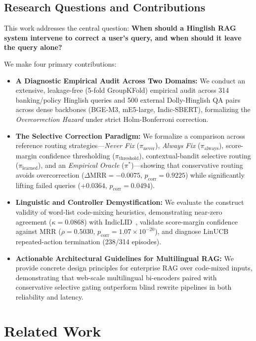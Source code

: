 \documentclass[conference]{IEEEtran}
\begin{document}
\subsection{Research Questions and Contributions}
This work addresses the central question: \textbf{When should a Hinglish RAG system intervene to correct a user's query, and when should it leave the query alone?}

We make four primary contributions:
\begin{itemize}
    \item \textbf{A Diagnostic Empirical Audit Across Two Domains:} We conduct an extensive, leakage-free (5-fold GroupKFold) empirical audit across 314 banking/policy Hinglish queries and 500 external Dolly-Hinglish QA pairs across dense backbones (BGE-M3, mE5-large, Indic-SBERT), formalizing the \textit{Overcorrection Hazard} under strict Holm-Bonferroni correction.
    \item \textbf{The Selective Correction Paradigm:} We formalize a comparison across reference routing strategies---\textit{Never Fix} ($\pi_{\text{never}}$), \textit{Always Fix} ($\pi_{\text{always}}$), score-margin confidence thresholding ($\pi_{\text{threshold}}$), contextual-bandit selective routing ($\pi_{\text{learned}}$), and an \textit{Empirical Oracle} ($\pi^*$)---showing that conservative routing avoids overcorrection ($\Delta\text{MRR}=-0.0075$, $p_{\text{corr}}=0.9225$) while significantly lifting failed queries ($+0.0364$, $p_{\text{corr}}=0.0494$).
    \item \textbf{Linguistic and Controller Demystification:} We evaluate the construct validity of word-list code-mixing heuristics, demonstrating near-zero agreement ($\kappa = 0.0868$) with IndicLID~\cite{madhani2023indiclid}, validate score-margin confidence against MRR ($\rho = 0.5030$, $p_{\text{corr}} = 1.07 \times 10^{-20}$), and diagnose LinUCB repeated-action termination (238/314 episodes).
    \item \textbf{Actionable Architectural Guidelines for Multilingual RAG:} We provide concrete design principles for enterprise RAG over code-mixed inputs, demonstrating that web-scale multilingual bi-encoders paired with conservative selective gating outperform blind rewrite pipelines in both reliability and latency.
\end{itemize}

\section{Related Work}
\label{sec:related_work}
\end{document}
